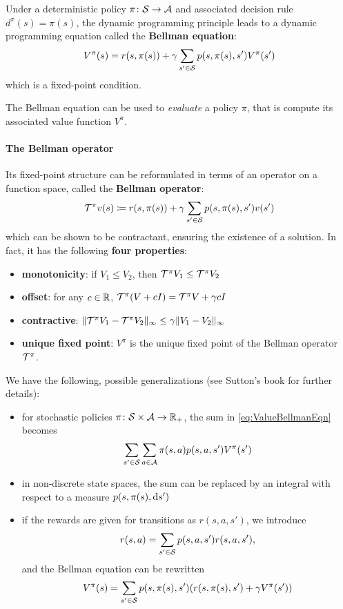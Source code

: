 \documentclass[../course-notes.tex]{subfiles}
\begin{document}
Under a deterministic policy $\pi\colon \mathcal{S} \to \mathcal{A}$ and associated decision rule $d^\pi(s) = \pi(s)$, the dynamic programming principle leads to a dynamic programming equation called the \textbf{\bluefont Bellman equation}:
\begin{equation}\label{eq:ValueBellmanEqn}
V^\pi(s) = r(s, \pi(s)) + \gamma\sum_{s'\in\mathcal{S}} p(s, \pi(s), s')V^\pi(s')
\end{equation}
which is a fixed-point condition.

The Bellman equation can be used to \textit{evaluate} a policy $\pi$, that is compute its associated value function $V^\pi$.

\paragraph{The Bellman operator} Its fixed-point structure can be reformulated in terms of an operator on a function space, called the \textbf{\bluefont Bellman operator}:
\[
	\mathcal{T}^\pi v(s) \coloneqq
	r(s,\pi(s)) + \gamma\sum_{s'\in\mathcal{S}}p(s,\pi(s),s') v(s')
\]
which can be shown to be contractant, ensuring the existence of a solution. In fact, it has the following \textbf{four properties}:
\begin{itemize}
	\item \textbf{monotonicity}: if $V_1\leq V_2$, then $\mathcal{T}^\pi V_1 \leq \mathcal{T}^\pi V_2$
	\item \textbf{offset}: for any $c\in\mathbb{R}$, $\mathcal{T}^\pi (V + cI) = \mathcal{T}^\pi V + \gamma cI$
	\item \textbf{contractive}:
	$\|\mathcal{T}^\pi V_1 - \mathcal{T}^\pi V_2\|_\infty \leq \gamma \|V_1 - V_2\|_\infty$
	\item \textbf{unique fixed point}: $V^\pi$ is the unique fixed point of the Bellman operator $\mathcal{T}^\pi$.
\end{itemize}


\begin{remark}
	We have the following, possible generalizations (see Sutton's book \cite[][chap.\ 3,4]{Sutton1998} for further details):
	\begin{itemize}
		\item for stochastic policies $\pi\colon \mathcal{S}\times\mathcal{A} \to \mathbb{R}_+$, the sum in \cref{eq:ValueBellmanEqn} becomes 
		\[
		\sum_{s'\in\mathcal{S}} \sum_{a\in\mathcal{A}} \pi(s,a) p(s,a,s')V^\pi(s')
		\]
		\item in non-discrete state spaces, the sum can be replaced by an integral with respect to a measure $p(s,\pi(s),\operatorname{d\!}{} s')$
		\item if the rewards are given for transitions as $r(s,a,s')$, we introduce
		\[
			r(s,a) = \sum_{s'\in\mathcal{S}} p(s,a,s') r(s,a,s'),
		\]
		and the Bellman equation can be rewritten
		\[
		V^\pi(s) = \sum_{s'\in\mathcal{S}} p(s,\pi(s),s')
		(r(s,\pi(s),s') + \gamma V^\pi(s'))
		\]
	\end{itemize}
\end{remark}
\end{document}
